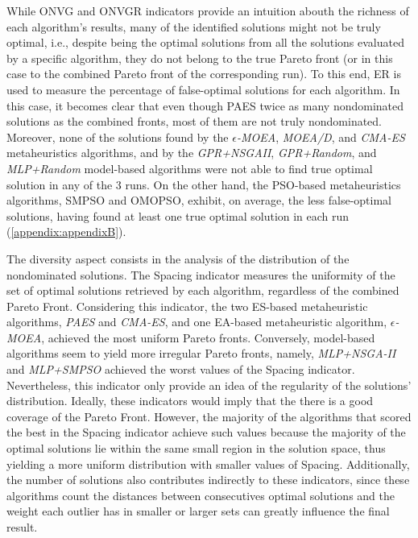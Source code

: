 While \ac{ONVG} and \ac{ONVGR} indicators provide an intuition abouth the richness of each algorithm's results, many of the identified solutions might not be truly optimal, i.e., despite being the optimal solutions from all the solutions evaluated by a specific algorithm, they do not belong to the true Pareto front (or in this case to the combined Pareto front of the corresponding run). To this end, \ac{ER} is used to measure the percentage of false-optimal solutions for each algorithm. In this case, it becomes clear that even though PAES twice as many nondominated solutions as the combined fronts, most of them are not truly nondominated. Moreover, none of the solutions found by the \textit{$\epsilon$-MOEA}, \textit{MOEA/D}, and \textit{CMA-ES} metaheuristics algorithms, and by the \textit{GPR+NSGAII}, \textit{GPR+Random}, and \textit{MLP+Random} model-based algorithms were not able to find true optimal solution in any of the 3 runs. On the other hand, the \ac{PSO}-based metaheuristics algorithms, SMPSO and OMOPSO, exhibit, on average, the less false-optimal solutions, having found at least one true optimal solution in each run (\cref{appendix:appendixB}).

The diversity aspect consists in the analysis of the distribution of the nondominated solutions. The Spacing indicator measures the uniformity of the set of optimal solutions retrieved by each algorithm, regardless of the combined Pareto Front. Considering this indicator, the two \ac{ES}-based metaheuristic algorithms, \textit{PAES} and \textit{CMA-ES}, and one \ac{EA}-based metaheuristic algorithm, \textit{$\epsilon$-MOEA}, achieved the most uniform Pareto fronts. Conversely, model-based algorithms seem to yield more irregular Pareto fronts, namely, \textit{MLP+NSGA-II} and \textit{MLP+SMPSO} achieved the worst values of the Spacing indicator. Nevertheless, this indicator only provide an idea of the regularity of the solutions' distribution. Ideally, these indicators would imply that the there is a good coverage of the Pareto Front. However, the majority of the algorithms that scored the best in the Spacing indicator achieve such values because the majority of the optimal solutions lie within the same small region in the solution space, thus yielding a more uniform distribution with smaller values of Spacing. Additionally, the number of solutions also contributes indirectly to these indicators, since these algorithms count the distances between consecutives optimal solutions and the weight each outlier has in smaller or larger sets can greatly influence the final result.

